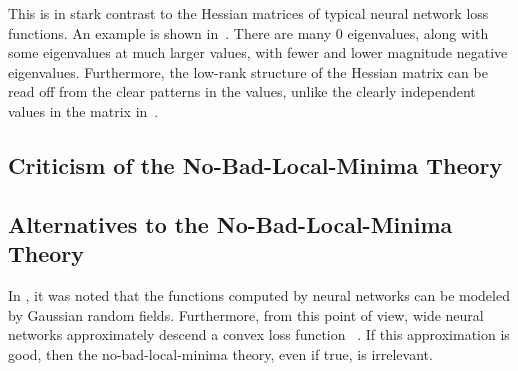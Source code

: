\documentclass[../../thesis.tex]{subfiles}
\begin{document}
This is in stark contrast to the Hessian matrices
of typical neural network loss functions.
An example is shown in~.
There are many $0$ eigenvalues,
along with some eigenvalues at much larger values,
with fewer and lower magnitude negative eigenvalues.
Furthermore, the low-rank structure of the Hessian matrix
can be read off from the clear patterns in the values,
unlike the clearly independent values
in the matrix in~.

\subsection{Criticism of the No-Bad-Local-Minima Theory}
\subsection{Alternatives to the No-Bad-Local-Minima Theory}

In , it was noted that
the functions computed by neural networks
can be modeled by Gaussian random fields.
Furthermore, from this point of view,
wide neural networks approximately descend a convex loss function%
~\cite{jacot2018}.
If this approximation is good,
then the no-bad-local-minima theory,
even if true,
is irrelevant.

\onlyinsubfile{\printbibliography}
\end{document}

